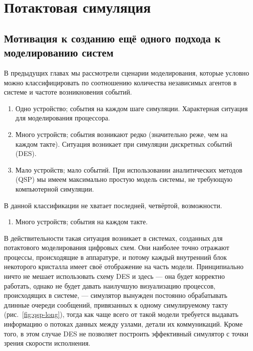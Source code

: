 \chapter{Потактовая симуляция}\label{chapter09}


\section[Мотивация]{Мотивация к созданию ещё одного подхода к моделированию систем}

В предыдущих главах мы рассмотрели сценарии моделирования, которые условно можно классифицировать по соотношению количества независимых агентов в системе и частоте возникновения событий.

\begin{enumerate}
    \item Одно устройство; события на каждом шаге симуляции. Характерная ситуация для моделирования процессора.
    \item Много устройств; события возникают редко (значительно реже, чем на каждом такте). Ситуация возникает при симуляции дискретных событий (DES).
    \item Мало устройств; мало событий. При использовании аналитических методов (QSP) мы имеем максимально простую модель системы, не требующую компьютерной симуляции.
\end{enumerate}

В данной классификации не хватает последней, четвёртой, возможности.

\begin{enumerate}[resume] %
    \item Много устройств; события на каждом такте.
\end{enumerate}

В действительности такая ситуация возникает в системах, созданных для потактового моделирования  цифровых схем. Они наиболее точно отражают процессы, происходящие в аппаратуре, и потому каждый внутренний блок некоторого кристалла имеет своё отображение на часть модели. Принципиально ничто не мешает использовать схему DES и здесь --- она будет корректно работать, однако не будет давать наилучшую визуализацию процессов, происходящих в системе, --- симулятор вынужден постоянно обрабатывать длинные очереди сообщений, привязанных к одному симулируемому такту (рис.~\ref{fig:qsp-long}), тогда как чаще всего от такой модели требуется выдавать информацию о потоках данных между узлами, детали их коммуникаций. Кроме того, в этом случае DES не позволяет построить эффективный симулятор с точки зрения скорости исполнения.

